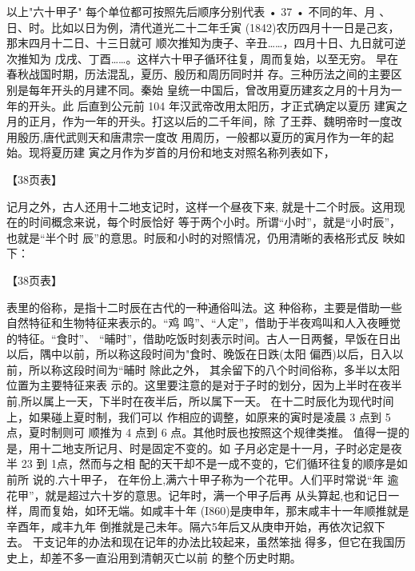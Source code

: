 以上"六十甲子" 每个单位都可按照先后顺序分别代表
• 37 •
不同的年、月 、日、时。比如以日为例，清代道光二十二年壬寅
(1842)农历四月十一日是己亥，那末四月十二日、十三日就可
顺次推知为庚子、辛丑……，四月十日、九日就可逆次推知为
戊戌、丁酉……。这样六十甲子循环往复，周而复始，以至无穷。
早在春秋战国时期，历法混乱，夏历、殷历和周历同时并
存。三种历法之间的主要区别是每年开头的月建不同。秦始
皇统一中国后，曾改用夏历建亥之月的十月为一年的开头。此
后直到公元前 104 年汉武帝改用太阳历，才正式确定以夏历
建寅之月的正月，作为一年的开头。打这以后的二千年间，除
了王莽、魏明帝时一度改用殷历,唐代武则天和唐肃宗一度改
用周历，一般都以夏历的寅月作为一年的起始。现将夏历建
寅之月作为岁首的月份和地支对照名称列表如下，

【38页表】

记月之外，古人还用十二地支记时，这样一个昼夜下来,
就是十二个时辰。这用现在的时间概念来说，每个时辰恰好
等于两个小时。所谓“小时”，就是“小时辰”，也就是“半个时
辰”的意思。时辰和小时的对照情况，仍用清晰的表格形式反
映如下：

【38页表】

表里的俗称，是指十二时辰在古代的一种通俗叫法。这
种俗称，主要是借助一些自然特征和生物特征来表示的。“鸡
鸣”、“人定”，借助于半夜鸡叫和人入夜睡觉的特征。“食时”、
“晡时”，借助吃饭时刻表示时间。古人一日两餐，早饭在日出
以后，隅中以前，所以称这段时间为"食时、晚饭在日跌(太阳
偏西)以后，日入以前，所以称这段时间为“晡时 除此之外，
其余留下的八个时间俗称，多半以太阳位置为主要特征来表
示的。这里要注意的是对于子时的划分，因为上半时在夜半
前,所以属上一天，下半时在夜半后，所以属下一天。
在十二时辰化为现代时间上，如果碰上夏时制，我们可以
作相应的调整，如原来的寅时是凌晨 3 点到 5点，夏时制则可
顺推为 4 点到 6 点。其他时辰也按照这个规律类推。
值得一提的是，用十二地支所记月、时是固定不变的。如
子月必定是十一月，子时必定是夜半 23 到 1点，然而与之相
配的天干却不是一成不变的，它们循环往复的顺序是如前所
说的.六十甲子，
在年份上,满六十甲子称为一个花甲。人们平时常说“年
逾花甲”，就是超过六十岁的意思。记年时，满一个甲子后再
从头算起,也和记日一样，周而复始，如环无端。如咸丰十年
(I860)是庚申年，那末咸丰十一年顺推就是辛酉年，咸丰九年
倒推就是己未年。隔六5年后又从庚申开始，再依次记叙下
去。
干支记年的办法和现在记年的办法比较起来，虽然笨拙
得多，但它在我国历史上，却差不多一直沿用到清朝灭亡以前
的整个历史时期。

